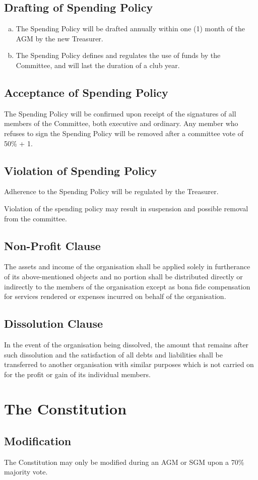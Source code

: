 \documentclass[a4paper,12pt]{article}
\begin{document}
\subsection{Drafting of Spending Policy}

\begin{enumerate}[a)]
	\item The Spending Policy will be drafted annually within one (1) month of the AGM by the new Treasurer.
	\item The Spending Policy defines and regulates the use of funds by the Committee, and will last the duration of a club year.
\end{enumerate}

\subsection{Acceptance of Spending Policy}

The Spending Policy will be confirmed upon receipt of the signatures of all members of the Committee, both executive and ordinary. Any member who refuses to sign the Spending Policy will be removed after a committee vote of 50\% + 1.

\subsection{Violation of Spending Policy}

Adherence to the Spending Policy will be regulated by the Treasurer.

Violation of the spending policy may result in suspension and possible removal from the committee.

\subsection{Non-Profit Clause}

The assets and income of the organisation shall be applied solely in furtherance of its above-mentioned objects and no portion shall be distributed directly or indirectly to the members of the organisation except as bona fide compensation for services rendered or expenses incurred on behalf of the organisation.

\subsection{Dissolution Clause}

In the event of the organisation being dissolved, the amount that remains after such dissolution and the satisfaction of all debts and liabilities shall be transferred to another organisation with similar purposes which is not carried on for the profit or gain of its individual members.

\section{The Constitution}

\subsection{Modification}

The Constitution may only be modified during an AGM or SGM upon a 70\% majority vote.
\end{document}
